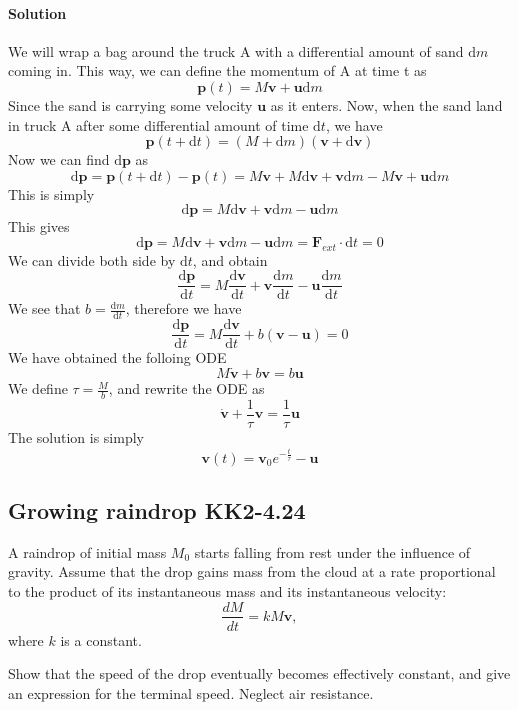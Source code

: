 \documentclass[11pt,letterpaper]{article}
\newcommand{\dydx}[2]{\frac{\text{d} #1}{\text{d} #2}}
\newcommand{\paren}[1]{\left( #1 \right)}
\newcommand{\dfl}{\text{d}}
\begin{document}
\paragraph{Solution} We will wrap a bag around the truck A with a differential amount of sand $\dfl m$ coming in. This way, we can define the momentum of A at time t as
\[
\mathbf{p}(t) = M\mathbf{v} + \mathbf{u}\dfl m
\]
Since the sand is carrying some velocity $\mathbf{u}$ as it enters. Now, when the sand land in truck A after some differential amount of time $\dfl t$, we have
\[
\mathbf{p}(t+\dfl t) = (M+\dfl m)\paren{\mathbf{v}+\dfl\mathbf{v}} 
\]
Now we can find $\dfl \mathbf{p}$ as
\[
\dfl \mathbf{p} = \mathbf{p}(t+\dfl t) - \mathbf{p}(t) = M\mathbf{v}+M\dfl\mathbf{v}+\mathbf{v}\dfl m - M\mathbf{v} + \mathbf{u}\dfl m
\]
This is simply
\[
\dfl \mathbf{p} = M\dfl \mathbf{v}+\mathbf{v}\dfl m -\mathbf{u}\dfl m
\]
This gives 
\[
\dfl \mathbf{p} = M\dfl \mathbf{v}+\mathbf{v}\dfl m -\mathbf{u}\dfl m = \mathbf{F}_{ext}\cdot \dfl t = 0
\]
We can divide both side by $\dfl t$, and obtain
\[
\dydx{\mathbf{p}}{t} = M\dydx{\mathbf{v}}{t}+\mathbf{v}\dydx{m}{t} -\mathbf{u}\dydx{m}{t}
\]
We see that $b = \dydx{m}{t}$, therefore we have
\[
\dydx{\mathbf{p}}{t} = M\dydx{\mathbf{v}}{t}+ b\paren{\mathbf{v - \mathbf{u}}} = 0
\]
We have obtained the folloing ODE
\[
M\dot{\mathbf{v}} + b\mathbf{v} = b\mathbf{u}
\]
We define $\tau = \frac{M}{b}$, and rewrite the ODE as
\[
\dot{\mathbf{v}} + \frac{1}{\tau}\mathbf{v} = \frac{1}{\tau}\mathbf{u}
\]
The solution is simply
\[
\mathbf{v}(t) = \mathbf{v}_0e^{-\frac{t}{\tau}} - \mathbf{u}
\]



\subsection{Growing raindrop KK2-4.24}
A raindrop of initial mass $M_0$ starts falling from rest under the influence of gravity. Assume that the drop gains mass from the cloud at a rate proportional to the product of its instantaneous mass and its instantaneous velocity:
\[
\frac{dM}{dt} = k M \mathbf{v},
\]
where $k$ is a constant. 

Show that the speed of the drop eventually becomes effectively constant, and give an expression for the terminal speed. Neglect air resistance.
\end{document}

